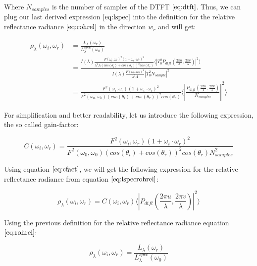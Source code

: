 Where $N_{samples}$ is the number of samples of the DTFT $\ref{eq:dtft}$. Thus, we can plug our last derived expression $\ref{eq:lspec}$ into the definition for the relative reflectance radiance $\ref{eq:rohrel}$ in the direction $w_r$ and will get:

\begin{align}
\rho_\lambda(\omega_i,\omega_r)
& = \frac{L_\lambda(\omega_r)}{L_\lambda^{spec}(\omega_0)} \nonumber \\
& = \frac{I(\lambda) \frac{F(\omega_i, \omega_r)^2 (1 + \omega_i \cdot \omega_r)^2}{\lambda^2 A (cos(\theta_i)+cos(\theta_r))^2 cos(\theta_r)} \langle \left|T_0^2 P_{dtft}(\frac{2\pi u}{\lambda}, \frac{2\pi v}{\lambda}) \right|^2\rangle}{I(\lambda) \frac{F(\omega_0, \omega_0)^2}{\lambda^2 A}\left| T_0^2 N_{sample} \right|^2 } \nonumber \\
& = \frac{F^2(\omega_i,\omega_r)(1 + \omega_i \cdot \omega_r)^2}{F^2(\omega_0,\omega_0)(cos(\theta_i)+cos(\theta_r))^2 cos(\theta_r)} \langle \left|\frac{P_{dtft}(\frac{2\pi u}{\lambda}, \frac{2\pi v}{\lambda})}{N_{samples}}\right|^2\rangle
\label{eq:lspecrohrel}
\end{align}

For simplification and better readability, let us introduce the following expression, the so called gain-factor:

\begin{equation} 
    C(\omega_i,\omega_r) = \frac{F^2(\omega_i,\omega_r)(1 + \omega_i \cdot \omega_r)^2}{F^2(\omega_0,\omega_0)(cos(\theta_i)+cos(\theta_r))^2 cos(\theta_r) N_{samples}^2}
\label{eq:cfact}
\end{equation}

Using equation $\ref{eq:cfact}$, we will get the following expression for the relative reflectance radiance from equation $\ref{eq:lspecrohrel}$:

\begin{equation}
\rho_\lambda(\omega_i,\omega_r) =  C(\omega_i,\omega_r) \langle \left|P_{dtft}(\frac{2\pi u}{\lambda}, \frac{2\pi v}{\lambda})\right|^2\rangle
\label{eq:cpterm}
\end{equation}

Using the previous definition for the relative reflectance radiance equation $\ref{eq:rohrel}$:

\begin{equation}
 \rho_\lambda(\omega_i,\omega_r) = \frac{L_\lambda(\omega_r)}{L_\lambda^{spec}(\omega_0)} 
\end{equation}

